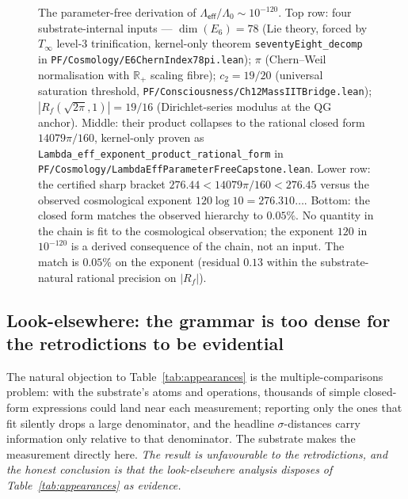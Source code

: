\documentclass[11pt,a4paper]{amsart}
\theoremstyle{plain}
\theoremstyle{definition}
\begin{document}
\begin{figure}[h]
\caption{The parameter-free derivation of $\Lambda_{\textsf{eff}}/\Lambda_0 \sim 10^{-120}$. Top row: four substrate-internal inputs --- $\dim(E_6) = 78$ (Lie theory, forced by $T_\infty$ level-3 trinification, kernel-only theorem \texttt{seventyEight\_decomp} in \texttt{PF/Cosmology/E6ChernIndex78pi.lean}); $\pi$ (Chern--Weil normalisation with $\mathbb{R}_+$ scaling fibre); $c_2 = 19/20$ (universal saturation threshold, \texttt{PF/Consciousness/Ch12MassIITBridge.lean}); $|R_f(\sqrt{2\pi}, 1)| = 19/16$ (Dirichlet-series modulus at the QG anchor). Middle: their product collapses to the rational closed form $14079\pi/160$, kernel-only proven as \texttt{Lambda\_eff\_exponent\_product\_rational\_form} in \texttt{PF/Cosmology/LambdaEffParameterFreeCapstone.lean}. Lower row: the certified sharp bracket $276.44 < 14079\pi/160 < 276.45$ versus the observed cosmological exponent $120 \log 10 = 276.310\ldots$. Bottom: the closed form matches the observed hierarchy to $0.05\%$. No quantity in the chain is fit to the cosmological observation; the exponent $120$ in $10^{-120}$ is a derived consequence of the chain, not an input. The match is $0.05\%$ on the exponent (residual $0.13$ within the substrate-natural rational precision on $|R_f|$).}
\label{fig:lambdaeff}
\end{figure}

\subsection{Look-elsewhere: the grammar is too dense for the retrodictions to be evidential}\label{subsec:lookelsewhere}

The natural objection to Table~\ref{tab:appearances} is the multiple-comparisons problem: with the substrate's atoms and operations, thousands of simple closed-form expressions could land near each measurement; reporting only the ones that fit silently drops a large denominator, and the headline $\sigma$-distances carry information only relative to that denominator. The substrate makes the measurement directly here. \emph{The result is unfavourable to the retrodictions, and the honest conclusion is that the look-elsewhere analysis disposes of Table~\ref{tab:appearances} as evidence.}
\end{document}
